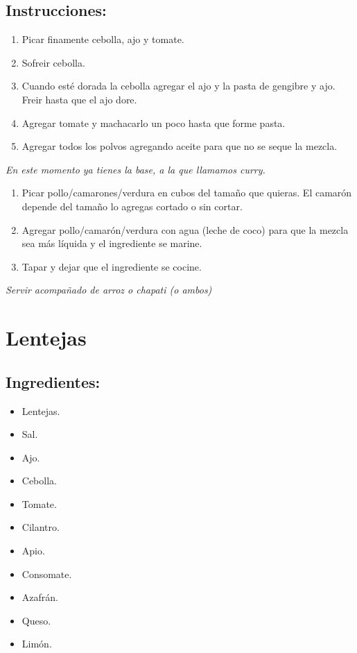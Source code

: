 \documentclass[a4paper]{article}
\begin{document}
	\subsection{Instrucciones:}
	\begin{enumerate}
		\item Picar finamente cebolla, ajo y tomate.
		\item Sofreir cebolla.
		\item Cuando esté dorada la cebolla agregar el ajo y la pasta de gengibre y ajo.
			Freir hasta que el ajo dore.
		\item Agregar tomate y machacarlo un poco hasta que forme pasta.
		\item Agregar todos los polvos agregando aceite para que no se seque la mezcla.
	\end{enumerate}
	\textit{En este momento ya tienes la base, a la que llamamos curry.}
	\begin{enumerate}
		\item Picar pollo/camarones/verdura en cubos del tamaño que quieras.
			El camarón depende del tamaño lo agregas cortado o sin cortar.
		\item Agregar pollo/camarón/verdura con agua (leche de coco) para que la mezcla sea más líquida y el ingrediente se marine.
		\item Tapar y dejar que el ingrediente se cocine.
	\end{enumerate}
	\textit{Servir acompañado de arroz o chapati (o ambos)}

	\newpage
	\section{Lentejas}
	\subsection{Ingredientes:}
	\begin{itemize}
		\item Lentejas.
		\item Sal.
		\item Ajo.
		\item Cebolla.
		\item Tomate.
		\item Cilantro.
		\item Apio.
		\item Consomate.
		\item Azafrán.
		\item Queso.
		\item Limón.
	\end{itemize}
\end{document}
